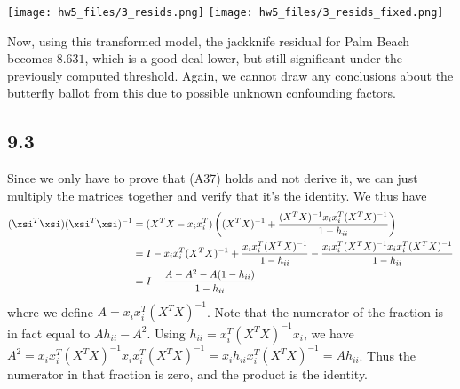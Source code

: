 \documentclass{article}
\begin{document}
\texttt{[image: hw5\_files/3\_resids.png]}
\texttt{[image: hw5\_files/3\_resids\_fixed.png]}

Now, using this transformed model, the jackknife residual for Palm Beach becomes $8.631$, which is a good deal lower, but still significant under the previously computed threshold. Again, we cannot draw any conclusions about the butterfly ballot from this due to possible unknown confounding factors.
\subsection*{9.3}
Since we only have to prove that (A37) holds and not derive it, we can just multiply the matrices together and verify that it's the identity. We thus have
\begin{align*}
    (\xsi^T\xsi)(\xsi^T\xsi)^{-1}&=(X^TX-x_ix_i^T)\left((X^TX)^{-1}+\frac{(X^TX)^{-1}x_ix_i^T(X^TX)^{-1}}{1-h_{ii}}\right)\\
                                 &=I-x_ix_i^T(X^TX)^{-1}+\frac{x_ix_i^T(X^TX)^{-1}}{1-h_{ii}}-\frac{x_ix_i^T(X^TX)^{-1}x_ix_i^T(X^TX)^{-1}}{1-h_{ii}}\\
                                 &=I-\frac{A-A^2-A(1-h_{ii})}{1-h_{ii}}\\
\end{align*}
where we define $A=x_ix_i^T(X^TX)^{-1}$. Note that the numerator of the fraction is in fact equal to $Ah_{ii}-A^2$. Using $h_{ii}=x_i^T(X^TX)^{-1}x_i$, we have $A^2=x_ix_i^T(X^TX)^{-1}x_ix_i^T(X^TX)^{-1}=x_ih_{ii}x_i^T(X^TX)^{-1}=Ah_{ii}$. Thus the numerator in that fraction is zero, and the product is the identity.
\end{document}
